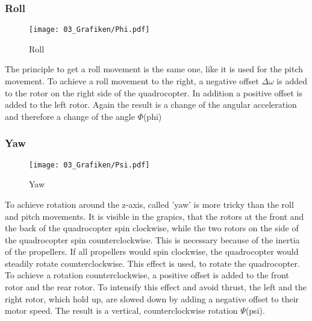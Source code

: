 \subsubsection{Roll}
\begin{figure}[htbp]
	\centering
		\texttt{[image: 03\_Grafiken/Phi.pdf]}
	\caption{Roll}
	\label{fig:Phi}
\end{figure}
The principle to get a roll movement is the same one, like it is used for the pitch movement. To achieve a roll movement to the right, a negative offset $\Delta\omega$ is added to the rotor on the right side of the quadrocopter. In addition a positive offset is added to the left rotor. Again the result is a change of the angular acceleration and therefore a change of the angle $\Phi$(phi)

\subsubsection{Yaw}
\begin{figure}[htbp]
	\centering
		\texttt{[image: 03\_Grafiken/Psi.pdf]}
	\caption{Yaw}
	\label{fig:Psi}
\end{figure}
To achieve rotation around the z-axis, called 'yaw' is more tricky than the roll and pitch movements.
It is visible in the grapics, that the rotors at the front and the back of the quadrocopter spin clockwise, while the two rotors on the side of the quadrocopter spin counterclockwise. This is necessary because of the inertia of the propellers. If all propellers would spin clockwise, the quadrocopter would steadily rotate counterclockwise. This effect is used, to rotate the quadrocopter.
To achieve a rotation counterclockwise, a positive offset is added to the front rotor and the rear rotor. To intensify this effect and avoid thrust, the left and the right rotor, which hold up, are slowed down by adding a negative offset to their motor speed. The result is a vertical, counterclockwise rotation $\Psi$(psi).